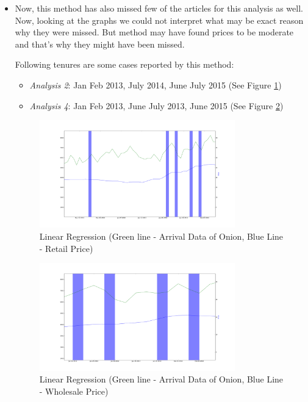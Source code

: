 \documentclass[a4paper,10pt]{report}
\begin{document}
\begin{itemize}
			
			
			\item Now, this method has also missed few of the articles for this analysis as well. Now, looking at the graphs we could not interpret what may be exact reason why they were missed. But method may have found prices to be moderate and that's why they might have been missed.
			
			Following tenures are some cases reported by this method:
			\begin{itemize}
				\item \textit{Analysis 2}: Jan Feb 2013, July 2014, June July 2015 (See Figure \ref{fig:12222})
				\item \textit{Analysis 4}: Jan Feb 2013, June July 2013, June 2015 (See Figure \ref{fig:12242})
			\end{itemize}
			\begin{figure}[H]
		    	\centering
  		    	\includegraphics[width=0.8\textwidth]{graphs/12222.png}
		    	\caption{Linear Regression (Green line - Arrival Data of Onion, Blue Line - Retail Price)}
		    	\label{fig:12222}
			\end{figure}
			
			\begin{figure}[H]
		    	\centering
  		    	\includegraphics[width=0.8\textwidth]{graphs/12242.png}
		    	\caption{Linear Regression (Green line - Arrival Data of Onion, Blue Line - Wholesale Price)}
		    	\label{fig:12242}
			\end{figure}
		\end{itemize}
\end{document}

